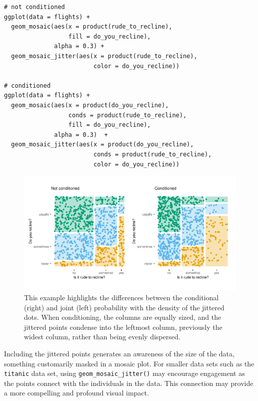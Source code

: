 \begin{verbatim}
# not conditioned
ggplot(data = flights) +
  geom_mosaic(aes(x = product(rude_to_recline), 
                  fill = do_you_recline), 
              alpha = 0.3) +
  geom_mosaic_jitter(aes(x = product(rude_to_recline), 
                         color = do_you_recline))
  
# conditioned
ggplot(data = flights) +
  geom_mosaic(aes(x = product(do_you_recline), 
                  conds = product(rude_to_recline), 
                  fill = do_you_recline), 
              alpha = 0.3)  +
  geom_mosaic_jitter(aes(x = product(do_you_recline), 
                         conds = product(rude_to_recline), 
                         color = do_you_recline))
\end{verbatim}

\begin{figure}[h]

{\centering \includegraphics[width=1\linewidth]{RJ-2023-013_files/figure-latex/jitter-1} 

}

\caption{This example highlights the differences between the conditional (right) and joint (left) probability with the density of the jittered dots. When conditioning, the columns are equally sized, and the jittered points condense into the leftmost column, previously the widest column, rather than being evenly dispersed.}\label{fig:jitter}
\end{figure}

Including the jittered points generates an awareness of the size of the data, something customarily masked in a mosaic plot. For smaller data sets such as the \texttt{titanic} data set, using \texttt{geom\_mosaic\_jitter()} may encourage engagement as the points connect with the individuals in the data. This connection may provide a more compelling and profound visual impact.

